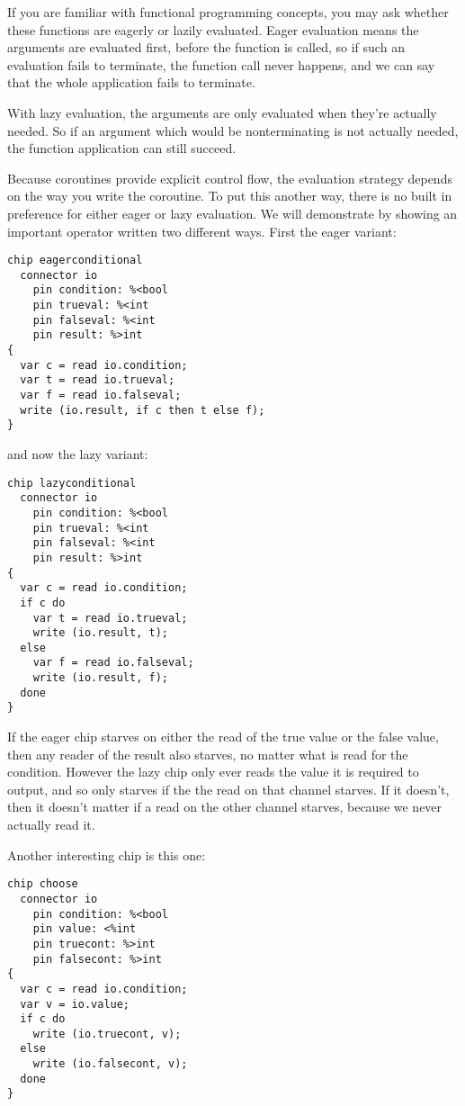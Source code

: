 \documentclass[oneside]{book}
\begin{document}
If you are familiar with functional programming concepts, you may
ask whether these functions are eagerly or lazily evaluated.
Eager evaluation means the arguments are evaluated first,
before the function is called, so if such an evaluation fails
to terminate, the function call never happens, and we can say that
the whole application fails to terminate.

With lazy evaluation, the arguments are only evaluated when they're
actually needed. So if an argument which would be nonterminating
is not actually needed, the function application can still succeed.

Because coroutines provide explicit control flow, the evaluation
strategy depends on the way you write the coroutine. To put this
another way, there is no built in preference for either eager or
lazy evaluation. We will demonstrate by showing an important
operator written two different ways. First the eager variant:

\begin{verbatim}
chip eagerconditional
  connector io
    pin condition: %<bool
    pin trueval: %<int
    pin falseval: %<int
    pin result: %>int
{
  var c = read io.condition;
  var t = read io.trueval;
  var f = read io.falseval;
  write (io.result, if c then t else f);
}
\end{verbatim}

and now the lazy variant:

\begin{verbatim}
chip lazyconditional
  connector io
    pin condition: %<bool
    pin trueval: %<int
    pin falseval: %<int
    pin result: %>int
{
  var c = read io.condition;
  if c do
    var t = read io.trueval;
    write (io.result, t);
  else 
    var f = read io.falseval;
    write (io.result, f);
  done
}
\end{verbatim}

If the eager chip starves on either the read of the true value
or the false value, then any reader of the result also starves,
no matter what is read for the condition. However the lazy
chip only ever reads the value it is required to output,
and so only starves if the the read on that channel starves.
If it doesn't, then it doesn't matter if a read on the
other channel starves, because we never actually read it.

Another interesting chip is this one:

\begin{verbatim}
chip choose
  connector io
    pin condition: %<bool
    pin value: <%int
    pin truecont: %>int
    pin falsecont: %>int
{
  var c = read io.condition;
  var v = io.value;
  if c do
    write (io.truecont, v);
  else
    write (io.falsecont, v);
  done
}
\end{verbatim}
\end{document}
